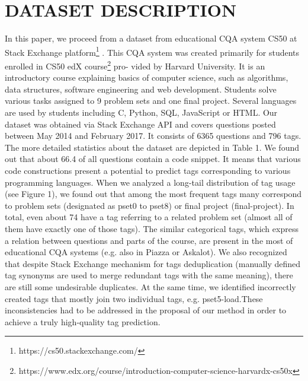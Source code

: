 \documentclass{sig-alternate}
\begin{document}
\section{DATASET DESCRIPTION
}
In this paper, we proceed from a dataset from educational CQA
system CS50 at Stack Exchange platform\footnote{https://cs50.stackexchange.com/} . This CQA system was
created primarily for students enrolled in CS50 edX course\footnote{https://www.edx.org/course/introduction-computer-science-harvardx-cs50x} pro-
vided by Harvard University.
It is an introductory course explaining basics of computer science,
such as algorithms, data structures, software engineering and web development. Students solve various tasks assigned to 9 problem
sets and one final project. Several languages are used by students
including C, Python, SQL, JavaScript or HTML.
Our dataset was obtained via Stack Exchange API and covers
questions posted between May 2014 and February 2017. It consists
of 6365 questions and 796 tags. The more detailed statistics about
the dataset are depicted in Table 1. We found out that about 66.4%
of all questions contain a code snippet. It means that various code
constructions present a potential to predict tags corresponding to
various programming languages.
When we analyzed a long-tail distribution of tag usage (see
Figure 1), we found out that among the most frequent tags many
correspond to problem sets (designated as pset0 to pset8) or final
project (final-project). In total, even about 74%
have a tag referring to a related problem set (almost all of them
have exactly one of those tags). The similar categorical tags, which
express a relation between questions and parts of the course, are
present in the most of educational CQA systems (e.g. also in Piazza
or Askalot).
We also recognized that despite Stack Exchange mechanism for
tags deduplication (manually defined tag synonyms are used to
merge redundant tags with the same meaning), there are still some
undesirable duplicates. At the same time, we identified incorrectly
created tags that mostly join two individual tags, e.g. pset5-load.These inconsistencies had to be addressed in the proposal of our
method in order to achieve a truly high-quality tag prediction.
\end{document}

